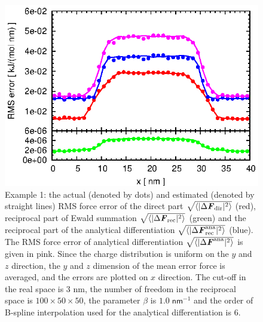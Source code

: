 \documentclass[aps,pre,preprint]{revtex4}
\renewcommand{\v}[1]{\textbf{\textit{#1}}}
\begin{document}
\begin{figure}
  \centering
  \includegraphics[]{fig/error.one_peak.box40x20x20.b1.000.r3.00.n6.K101x051x051/fig.ana.ewald.error.eps}
  \caption{Example 1: the actual (denoted by dots) and estimated
    (denoted by straight lines) RMS force error of the direct part
    $\sqrt{\langle\vert\Delta \v F_{\textrm{dir}}\vert^2\rangle}$
    (red), reciprocal part of Ewald summation
    $\sqrt{\langle\vert\Delta \v F_{\textrm{rec}}\vert^2\rangle}$
    (green) and the reciprocal part of the analytical differentiation
    $\sqrt{\langle\vert\Delta \v
      F^{\textrm{ana}}_{\textrm{rec}}\vert^2\rangle}$ (blue). The RMS
    force error of analytical differentiation
    $\sqrt{\langle\vert\Delta \v F^{\textrm{ana}}\vert^2\rangle}$ is
    given in pink.  Since the charge distribution is uniform on the
    $y$ and $z$ direction, the $y$ and $z$ dimension of the mean error
    force is averaged, and the errors are plotted on $x$ direction.
    The cut-off in the real space is 3 \textsf{nm}, the number of
    freedom in the reciprocal space is $100\times 50\times 50$, the
    parameter $\beta$ is $1.0\; \textsf{nm}^{-1}$ and the order of
    B-spline interpolation used for the analytical differentiation is
    6.}
  \label{fig:error1}
\end{figure}
\end{document}
